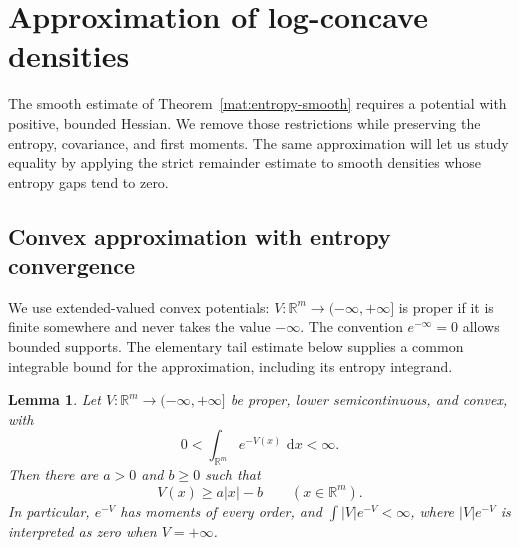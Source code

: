 \documentclass[11pt]{article}
\newtheorem{lemma}[theorem]{Lemma}
\theoremstyle{definition}
\theoremstyle{remark}
\numberwithin{equation}{section}
\begin{document}
\section{Approximation of log-concave densities}\label{geo:section}

The smooth estimate of Theorem~\ref{mat:entropy-smooth} requires a
potential with positive, bounded Hessian. We remove those restrictions
while preserving the entropy, covariance, and first moments. The same
approximation will let us study equality by applying the strict
remainder estimate to smooth densities whose entropy gaps tend to zero.

\subsection{Convex approximation with entropy convergence}

We use extended-valued convex potentials: $V:\mathbb R^m\to(-\infty,+\infty]$ is
proper if it is finite somewhere and never takes the value $-\infty$.
The convention $e^{-\infty}=0$ allows bounded supports.
The elementary tail estimate below supplies a common integrable bound for
the approximation, including its entropy integrand.

\begin{lemma}\label{geo:coercivity}
Let $V:\mathbb R^m\to(-\infty,+\infty]$ be proper, lower semicontinuous, and convex,
with
\[
  0<\int_{\mathbb R^m}e^{-V(x)}\,\,\mathrm d x<\infty.
\]
Then there are $a>0$ and $b\geq0$ such that
\begin{equation}\label{geo:linear-coercivity}
  V(x)\geq a|x|-b\qquad(x\in\mathbb R^m).
\end{equation}
In particular, $e^{-V}$ has moments of every order, and
$\int |V|e^{-V}<\infty$, where $|V|e^{-V}$ is interpreted as zero when
$V=+\infty$.
\end{lemma}
\end{document}
